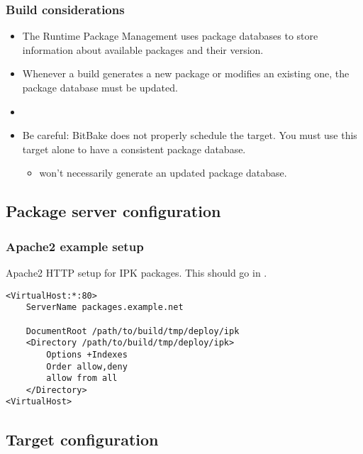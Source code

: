 \begin{frame}
  \frametitle{Build considerations}
  \begin{itemize}
    \item The Runtime Package Management uses package databases to
      store information about available packages and their version.
    \item Whenever a build generates a new package or modifies an
      existing one, the package database must be updated.
    \item {}
    \item Be careful: BitBake does not properly schedule the
       target. You must use this target alone to
      have a consistent package database.
      \begin{itemize}
        \item {} won't
          necessarily generate an updated package database.
      \end{itemize}
  \end{itemize}
\end{frame}

\subsection{Package server configuration}

\begin{frame}[fragile]
  \frametitle{Apache2 example setup}
  Apache2 HTTP setup for IPK packages. This should go in
  .
  \begin{block}{}
    \begin{verbatim}
<VirtualHost:*:80>
    ServerName packages.example.net

    DocumentRoot /path/to/build/tmp/deploy/ipk
    <Directory /path/to/build/tmp/deploy/ipk>
        Options +Indexes
        Order allow,deny
        allow from all
    </Directory>
<VirtualHost>
    \end{verbatim}
  \end{block}
\end{frame}

\subsection{Target configuration}

